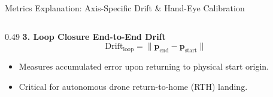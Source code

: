 \documentclass[aspectratio=169, 10pt]{beamer}
\begin{document}
\begin{frame}{Metrics Explanation: Axis-Specific Drift \& Hand-Eye Calibration}
\begin{columns}[T]
\begin{column}{0.49\textwidth}
      \vspace{0.15cm}
      {\small \textbf{\textcolor{NavyBlue}{3. Loop Closure End-to-End Drift}}}
      \begin{equation}
        \text{Drift}_{\text{loop}} = \|\mathbf{p}_{\text{end}} - \mathbf{p}_{\text{start}}\|
      \end{equation}
      \scriptsize
      \begin{itemize}
        \setlength{\itemsep}{2pt}
        \item Measures accumulated error upon returning to physical start origin.
        \item Critical for autonomous drone return-to-home (RTH) landing.
      \end{itemize}
    \end{column}
  \end{columns}
\end{frame}
\end{document}
